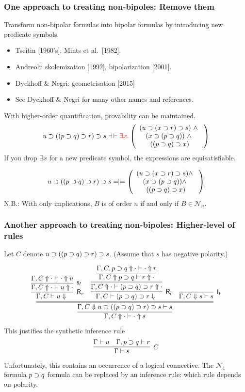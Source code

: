 \documentclass[9pt]{beamer}
\begin{document}
\begin{frame}
\frametitle{One approach to treating non-bipoles: Remove them}

Transform non-bipolar formulas into bipolar formulas by introducing
new predicate symbols.

\begin{itemize}
\item Tseitin [1960's], Mints et al.~[1982].
\item Andreoli: skolemization [1992], bipolarization [2001].
\item Dyckhoff \& Negri: geometrisation [2015]
\item See Dyckhoff \& Negri for many other names and references.
\end{itemize}

\vfill\pause
With higher-order quantification, provability can be maintained.
\[
  u\supset ((p\supset q)\supset r) \supset s \dashv\,\vdash {\color{red}\exists x. }
\left(\begin{array}{c}
    (u\supset(x\supset r) \supset s)~\wedge~\\
    (x\supset (p\supset q))~\wedge~\\
    ((p\supset q)\supset x)
\end{array}
\right)
\]
\pause
If you drop $\exists x$ for a new predicate symbol, the expressions
are equisatisfiable.

\[
  u\impl ((p\impl q)\impl r) \impl s \sledom \models
\left(\begin{array}{c}
    (u\impl (x\impl r) \impl s) \wedge~\\
    (x\impl (p\impl q))  \wedge~\\
    ((p\impl q)\impl x)
\end{array}
\right)
\]
\vfill
N.B.: With only implications, $B$ is of order $n$ if and only if $B\in\mathcal{N}_n$.
\vfill
\end{frame}

\begin{frame}
\frametitle{Another approach to treating non-bipoles: Higher-level of rules}

Let $C$ denote $u\supset ((p\supset q)\supset r) \supset s$.  (Assume that
$s$ has negative polarity.)

\[
  \infer{\jUnf{\Gamma, C}{\cdot}{\cdot}{s}}{
  \infer={\jLf{\Gamma, C}{u\impl ((p\impl q)\impl r) \impl s}{s}}{
    \infer[\krelease_r]{\jRf{\Gamma,C}{u}}{
       \infer[\kstore_l]{\jUnf{\Gamma,C}{\cdot}{u}{\cdot}}
                        {\jUnf{\Gamma,C}{\cdot}{\cdot}{u}}}
& 
  \infer[\krelease_l]{\jRf{\Gamma,C}{(p\impl q)\impl r}}{
  \infer{\jUnf{\Gamma,C}{\cdot}{(p\impl q)\impl r}{\cdot}}{
  \infer{\jUnf{\Gamma,C}{p\impl q}{r}{\cdot}}{
\jUnf{\Gamma,C,p\impl q}{\cdot}{\cdot}{r}
}}}
& 
    \infer[\kinit_l]{\jLf{\Gamma,C}{s}{s}}{}
}}
\]
This justifies the synthetic inference rule
\[
  \infer[C]{\Gamma\seq s}{ \Gamma\seq u & \Gamma,p\impl q \seq r}
\]
Unfortunately, this contains an occurrence of a logical connective.
\vfill
The $\mathcal{N}_1$ formula $p\supset q$ formula can be
replaced by an inference rule: which rule depends on polarity.
\vfill
\end{frame}
\end{document}
